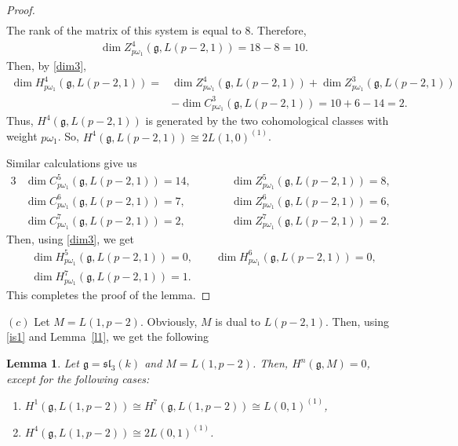 \documentclass[pdftex]{sigma}%
\numberwithin{equation}{section}
\newtheorem{Lemma}[Theorem]{Lemma}
\begin{document}
\begin{proof}
\begin{gather*}
\end{gather*}
The rank of the matrix of this system is equal to $8$. Therefore,
\begin{gather*}
\dim Z^4_{p\omega_1}(\mathfrak{g},L(p-2,1))=18-8=10.
\end{gather*}
Then, by \eqref{dim3},
\begin{align*}
\dim H^4_{p\omega_1}(\mathfrak{g},L(p-2,1))={}&
\dim Z^4_{p\omega_1}(\mathfrak{g},L(p-2,1))+\dim Z^3_{p\omega_1}(\mathfrak{g},L(p-2,1))
\\
&-\dim C^3_{p\omega_1}(\mathfrak{g},L(p-2,1))=10+6-14=2.
\end{align*}
Thus, $H^4(\mathfrak{g},L(p-2,1))$ is generated by the two cohomological classes with weight $p\omega_1$. So, $H^4(\mathfrak{g},L(p-2,1))\cong 2L(1,0)^{(1)}$.

Similar calculations give us
\begin{alignat*}{3}
&\dim C^5_{p\omega_1}(\mathfrak{g},L(p-2,1))=14, \qquad&&\dim Z^5_{p\omega_1}(\mathfrak{g},L(p-2,1))=8,&
\\
&\dim C^6_{p\omega_1}(\mathfrak{g},L(p-2,1))=7, \qquad&&\dim Z^6_{p\omega_1}(\mathfrak{g},L(p-2,1))=6,&
\\
&\dim C^7_{p\omega_1}(\mathfrak{g},L(p-2,1))=2, \qquad&&\dim Z^7_{p\omega_1}(\mathfrak{g},L(p-2,1))=2.&
\end{alignat*}
Then, using \eqref{dim3}, we get
\begin{gather*}
\dim H^5_{p\omega_1}(\mathfrak{g},L(p-2,1))=0,\qquad
\dim H^6_{p\omega_1}(\mathfrak{g},L(p-2,1))=0,
\\
\dim H^7_{p\omega_1}(\mathfrak{g},L(p-2,1))=1.
\end{gather*}
This completes the proof of the lemma.
\end{proof}

$(c)$ Let $M=L(1,p-2)$. Obviously, $M$ is dual to $L(p-2,1)$. Then, using \eqref{is1} and Lemma~\ref{l1}, we get the following

\begin{Lemma}%
Let $\mathfrak{g}=\mathfrak{sl}_3(k)$ and $M=L(1,p-2)$. Then, $H^n(\mathfrak{g},M)=0$, except for the following cases:

\begin{enumerate}\itemsep=0pt

\item[$(i)$] $H^1(\mathfrak{g},L(1,p-2))\cong H^7(\mathfrak{g},L(1,p-2))\cong L(0,1)^{(1)}$,

\item[$(ii)$] $H^4(\mathfrak{g},L(1,p-2))\cong 2L(0,1)^{(1)}$.

\end{enumerate}
\end{Lemma}
\end{document}
